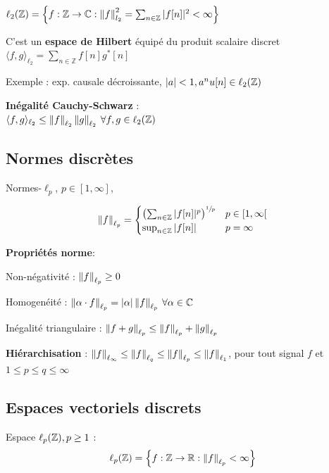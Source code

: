 $\ell_{2}(\mathbb{Z}) = \left\{ f : \mathbb{Z}\rightarrow\mathbb{C} : \left\lVert f\right\rVert_{l_2}^2 = \sum_{n\in\mathbb{Z}}|f[n]|^2 < \infty \right\}$

C'est un \textbf{espace de Hilbert} équipé du produit scalaire discret $\langle f, g \rangle_{\ell_2} = \sum_{n\in\mathbb{Z}} f[n]g^*[n]$

Exemple : exp. causale décroissante, $|a|<1, a^nu[n] \in \ell_{2}(\mathbb{Z})$

\textbf{Inégalité Cauchy-Schwarz} : \\
$\langle f, g \rangle_{\ell_2} \leq \left\lVert f\right\rVert_{\ell_2} \left\lVert g\right\rVert_{\ell_2} \: \forall f,g\in \ell_{2}(\mathbb{Z})$

\subsection*{Normes discrètes}

Normes-$\ell_p$, $p\in [1,\infty]$,

\begin{equation*}
    \left\lVert f\right\rVert_{\ell_p} = 
    \begin{cases}
    \left( \sum_{n\in\mathbb{Z}} |f[n]|^p \right)^{\sfrac{1}{p}} & p \in [1,\infty[\\
    \sup_{n\in\mathbb{Z}}|f[n]| & p = \infty
\end{cases}\end{equation*}

\textbf{Propriétés norme}:
\begin{myitemize}
    \item Non-négativité : $\left\lVert f\right\rVert_{\ell_p} \geq 0$
    \item Homogenéité : $\left\lVert\alpha\cdot f\right\rVert_{\ell_p} = |\alpha| \left\lVert f\right\rVert_{\ell_p} \: \forall \alpha\in\mathbb{C}$
    \item Inégalité triangulaire : $\left\lVert f+g\right\rVert_{\ell_p} \leq \left\lVert f\right\rVert_{\ell_p} + \left\lVert g\right\rVert_{\ell_p}$
\end{myitemize}

\textbf{Hiérarchisation} : $\left\lVert f\right\rVert_{\ell_{\infty}} \leq \left\lVert f\right\rVert_{\ell_{q}} \leq \left\lVert f\right\rVert_{\ell_{p}} \leq  \left\lVert f\right\rVert_{\ell_{1}}$, pour tout signal $f$ et $1\leq p \leq q \leq \infty$

\subsection*{Espaces vectoriels discrets}

Espace $\ell_{p}(\mathbb{Z}), p\geq 1$ : 
\begin{equation*}
    \ell_{p}(\mathbb{Z}) = \left\{ f: \mathbb{Z} \rightarrow \mathbb{R} : \left\lVert f\right\rVert_{\ell_{p}} < \infty \right\}
\end{equation*}

